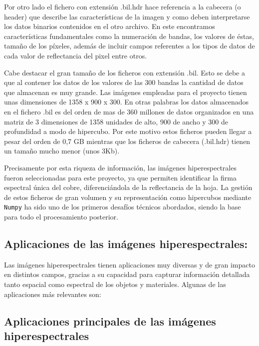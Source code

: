 Por otro lado el fichero con extensión .bil.hdr hace referencia a la cabecera (o header) que describe las características de la imagen y como deben interpretarse los datos binarios contenidos en el otro archivo. En este encontramos características fundamentales como la numeración de bandas, los valores de éstas,  tamaño de los píxeles, además de incluir campos referentes a los tipos de datos de cada valor de reflectancia del pixel entre otros.

Cabe destacar el gran tamaño de los ficheros con extensión .bil. Esto se debe a que al contener los datos de los valores de las 300 bandas la cantidad de datos que almacenan es muy grande. Las imágenes empleadas para el proyecto tienen unas dimensiones de 1358 x 900 x 300. En otras palabras los datos almacenados en el fichero .bil es del orden de mas de 360 millones de datos organizados en una matriz de 3 dimensiones de 1358 unidades de alto, 900 de ancho y 300 de profundidad a modo de hipercubo.
Por este motivo estos ficheros pueden llegar a pesar del orden de 0,7 GB  mientras que los ficheros de cabecera (.bil.hdr) tienen un tamaño mucho menor  (unos 3Kb).


Precisamente por esta riqueza de información, las imágenes hiperespectrales fueron seleccionadas para este proyecto, ya que permiten identificar la firma espectral única del cobre, diferenciándola de la reflectancia de la hoja. La gestión de estos ficheros de gran volumen y su representación como hipercubos mediante \verb|Numpy| ha sido uno de los primeros desafíos técnicos abordados, siendo la base para todo el procesamiento posterior.

\subsection{Aplicaciones de las imágenes hiperespectrales:}

Las imágenes hiperespectrales tienen aplicaciones muy diversas y de gran impacto en distintos campos, gracias a su capacidad para capturar información detallada tanto espacial como espectral de los objetos y materiales. Algunas de las aplicaciones más relevantes son:

\subsection{Aplicaciones principales de las imágenes hiperespectrales}

